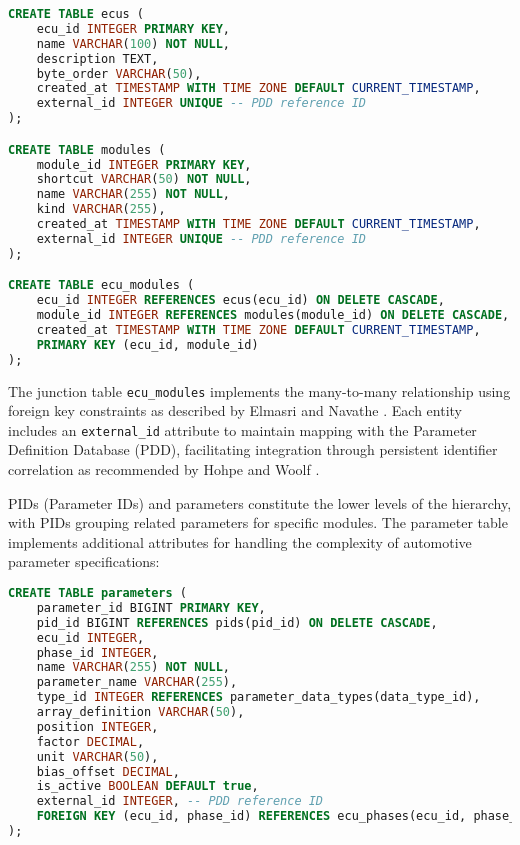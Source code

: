 \begin{lstlisting}[language=SQL, caption={ECU and Module Table Implementation}, label={lst:ecu-module-tables}]
CREATE TABLE ecus (
    ecu_id INTEGER PRIMARY KEY,
    name VARCHAR(100) NOT NULL,
    description TEXT,
    byte_order VARCHAR(50),
    created_at TIMESTAMP WITH TIME ZONE DEFAULT CURRENT_TIMESTAMP,
    external_id INTEGER UNIQUE -- PDD reference ID
);

CREATE TABLE modules (
    module_id INTEGER PRIMARY KEY,
    shortcut VARCHAR(50) NOT NULL,
    name VARCHAR(255) NOT NULL,
    kind VARCHAR(255),
    created_at TIMESTAMP WITH TIME ZONE DEFAULT CURRENT_TIMESTAMP,
    external_id INTEGER UNIQUE -- PDD reference ID
);

CREATE TABLE ecu_modules (
    ecu_id INTEGER REFERENCES ecus(ecu_id) ON DELETE CASCADE,
    module_id INTEGER REFERENCES modules(module_id) ON DELETE CASCADE,
    created_at TIMESTAMP WITH TIME ZONE DEFAULT CURRENT_TIMESTAMP,
    PRIMARY KEY (ecu_id, module_id)
);
\end{lstlisting}

The junction table \texttt{ecu\_modules} implements the many-to-many relationship using foreign key constraints as described by Elmasri and Navathe \cite{elmasri2015fundamentals}. Each entity includes an \texttt{external\_id} attribute to maintain mapping with the Parameter Definition Database (PDD), facilitating integration through persistent identifier correlation as recommended by Hohpe and Woolf \cite{hohpe2002enterprise}.

PIDs (Parameter IDs) and parameters constitute the lower levels of the hierarchy, with PIDs grouping related parameters for specific modules. The parameter table implements additional attributes for handling the complexity of automotive parameter specifications:

\begin{lstlisting}[language=SQL, caption={Parameter Table Implementation}, label={lst:parameter-table}]
CREATE TABLE parameters (
    parameter_id BIGINT PRIMARY KEY,
    pid_id BIGINT REFERENCES pids(pid_id) ON DELETE CASCADE,
    ecu_id INTEGER,
    phase_id INTEGER,
    name VARCHAR(255) NOT NULL,
    parameter_name VARCHAR(255),
    type_id INTEGER REFERENCES parameter_data_types(data_type_id),
    array_definition VARCHAR(50),
    position INTEGER,
    factor DECIMAL,
    unit VARCHAR(50),
    bias_offset DECIMAL,
    is_active BOOLEAN DEFAULT true,
    external_id INTEGER, -- PDD reference ID
    FOREIGN KEY (ecu_id, phase_id) REFERENCES ecu_phases(ecu_id, phase_id)
);
\end{lstlisting}

